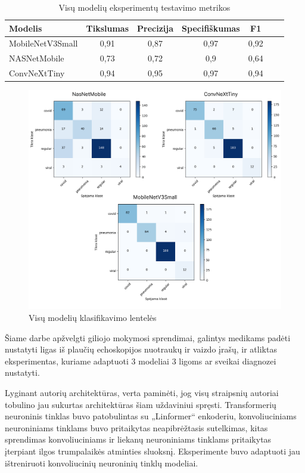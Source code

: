 \documentclass[fleqn]{VUMIFKompMagistrinis}
\begin{document}
\begin{table}[H]\footnotesize
  \centering
\caption{Visų modelių eksperimentų testavimo metrikos}
\begin{tabular}{|l|c|c|c|c|c|c|}
\hline
Modelis             & Tikslumas & Precizija & Specifiškumas & F1  \\ \hline
MobileNetV3Small    & 0,91      & 0,87      & 0,97          & 0,92\\
NASNetMobile        & 0,73      & 0,72      & 0,9          & 0,64 \\
ConvNeXtTiny        & 0,94      & 0,95      & 0,97           & 0,94 \\
\hline
  \end{tabular}
  \label{tab:eksper_tab}
\end{table}
\begin{figure}[H]
    \centering
    \includegraphics[scale=0.35]{img/eksperimentas.png}
    \caption{Visų modelių klasifikavimo lentelės}
    \label{img:eksper_le}
\end{figure}
Šiame darbe apžvelgti giliojo mokymosi sprendimai, galintys medikams padėti nustatyti ligas iš plaučių echoskopijos nuotraukų ir vaizdo įrašų, ir atliktas eksperimentas, kuriame adaptuoti 3 modeliai 3 ligoms ar sveikai diagnozei nustatyti.
\par
Lyginant autorių architektūras, verta paminėti, jog visų straipsnių autoriai tobulino jau sukurtas architektūras šiam uždaviniui spręsti. Transformerių neuroninis tinklas buvo patobulintas su „Linformer“ enkoderiu, konvoliuciniams neuroniniams tinklams buvo pritaikytas neapibrėžtasis sutelkimas, kitas sprendimas konvoliuciniams ir liekanų neuroniniams tinklams pritaikytas įterpiant ilgos trumpalaikės atminties sluoksnį. Eksperimente buvo adaptuoti jau ištreniruoti konvoliucinių neuroninių tinklų modeliai.
\end{document}
